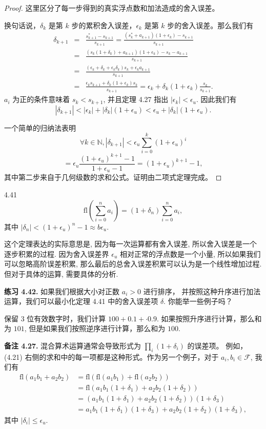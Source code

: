 \documentclass[a4paper]{ctexart}
\begin{document}
{\begin{proof}
这里区分了每一步得到的真实浮点数和加法造成的舍入误差。
  
换句话说，$\delta_k$ 是第 $k$ 步的累积舍入误差，$\epsilon_k$ 是第 $k$ 步的舍入误差。那么我们有
\begin{eqnarray*}
  \delta_{k+1} &=& \frac{s_{k+1}^* - s_{k+1}}{s_{k+1}} = \frac{(s_k^* + a_{k+1})(1 + \epsilon_k) - s_{k+1}}{s_{k+1}} \\
  &=& \frac{(s_k(1 + \delta_k) + a_{k+1})(1 + \epsilon_k) - s_k - a_{k+1}}{s_{k+1}} \\
  &=& \frac{(\epsilon_k + \delta_k + \epsilon_k \delta_k)s_k + \epsilon_k a_{k+1}}{s_{k+1}} \\
  &=& \frac{\epsilon_k s_{k+1} + \delta_k(1 + \epsilon_k)s_k}{s_{k+1}} = \epsilon_k + \delta_k(1 + \epsilon_k)\frac{s_k}{s_{k+1}}.
\end{eqnarray*}  
$a_i$ 为正的条件意味着 $s_k < s_{k + 1}$, 并且定理 4.27 指出 $|\epsilon_k| < \epsilon_u$. 因此我们有
\[
  |\delta_{k+1}| < |\epsilon_k| + |\delta_k|(1 + \epsilon_u) < \epsilon_u + |\delta_k|(1 + \epsilon_u).
\]
  
一个简单的归纳法表明
\[
  \forall k \in \mathbb{N}, |\delta_{k+1}| < \epsilon_u \sum_{i=0}^{k} (1 + \epsilon_u)^i \tag{4.21}
\]
\[
  = \epsilon_u \frac{(1 + \epsilon_u)^{k+1} - 1}{1 + \epsilon_u - 1} = (1 + \epsilon_u)^{k+1} - 1,
\]
其中第二步来自于几何级数的求和公式。证明由二项式定理完成。
\end{proof}

 4.41
$$
\mbox{fl}\left(\sum_{i = 0}^n a_i\right) = (1 + \delta_n)\sum_{i = 0}^n a_i,
$$
其中 $|\delta_n| < (1 + \epsilon_u)^n - 1 \approx b \epsilon_u$.

这个定理表达的实际意思是, 因为每一次运算都有舍入误差, 所以舍入误差是一个逐步积累的过程.
因为舍入误差界 $\epsilon_u$ 相对正常的浮点数是一个小量, 所以如果我们可以忽略高阶误差积累,
那么最后的总舍入误差积累可以认为是一个线性增加过程. 但对于具体的运算, 需要具体的分析.

\noindent \textbf{练习 4.42. } 如果我们根据大小对正数 $a_i > 0$ 进行排序，
并按照这种升序进行加法运算，我们可以最小化定理 4.41 中的舍入误差项 $\delta$. 
你能举一些例子吗？

保留 $3$ 位有效数字时，我们计算 $100 + 0.1 + \cdot 0.9$. 如果按照升序进行计算，那么和为 $101$, 
但是如果我们按照逆序进行计算，那么和为 $100$.

\noindent \textbf{备注 4.27.} 混合算术运算通常会导致形式为 $\prod_i (1 + \delta_i)$ 的误差项。
例如，(4.21) 右侧的求和中的每一项都是这种形式。作为另一个例子，对于 $a_i, b_i \in \mathcal{F}$, 我们有
\[
\begin{aligned}
\text{fl}(a_1b_1 + a_2b_2) &= \text{fl}(\text{fl}(a_1b_1) + \text{fl}(a_2b_2)) \\
&= \text{fl}(a_1b_1(1 + \delta_1) + a_2b_2(1 + \delta_2)) \\
&= (a_1b_1(1 + \delta_1) + a_2b_2(1 + \delta_2))(1 + \delta_3) \\
&= a_1b_1(1 + \delta_1)(1 + \delta_3) + a_2b_2(1 + \delta_2)(1 + \delta_3),
\end{aligned}
\]
其中 $|\delta_i| \leq \epsilon_u$.

}
\end{document}
